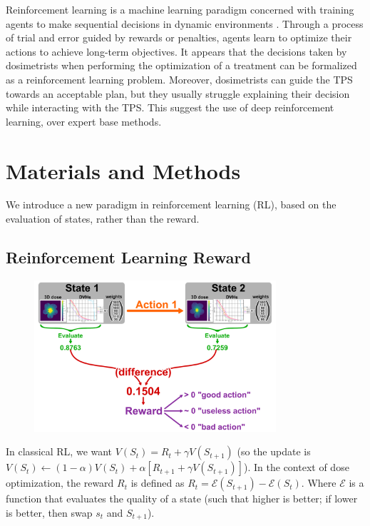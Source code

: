 Reinforcement learning is a machine learning paradigm concerned with training agents to make sequential decisions in dynamic environments \cite{brooks_what_2021}.
Through a process of trial and error guided by rewards or penalties, agents learn to optimize their actions to achieve long-term objectives.
It appears that the decisions taken by dosimetrists when performing the optimization of a treatment can be formalized as a reinforcement learning problem.
Moreover, dosimetrists can guide the TPS towards an acceptable plan, but they usually struggle explaining their decision while interacting with the TPS.
This suggest the use of deep reinforcement learning, over expert base methods.

\section{Materials and Methods}
We introduce a new paradigm in reinforcement learning (RL), based on the evaluation of states, rather than the reward.

\subsection{Reinforcement Learning Reward}

\begin{figure}
	\centering
	\includegraphics[width=0.8\textwidth]{reward.pdf}
	\caption{}
	\label{fig:reward_fig}
\end{figure}

In classical RL, we want $V(S_t) = R_t + \gamma V(S_{t+1})$
(so the update is $V(S_t) \leftarrow (1-\alpha) V(S_t) + \alpha \left[ R_{t+1} + \gamma V(S_{t+1}) \right]$).
In the context of dose optimization, the reward $R_t$ is defined as $R_t = \mathcal{E}(S_{t+1}) - \mathcal{E}(S_t)$.
Where $\mathcal{E}$ is a function that evaluates the quality of a state (such that higher is better; if lower is better, then swap $s_t$ and $S_{t+1}$).

